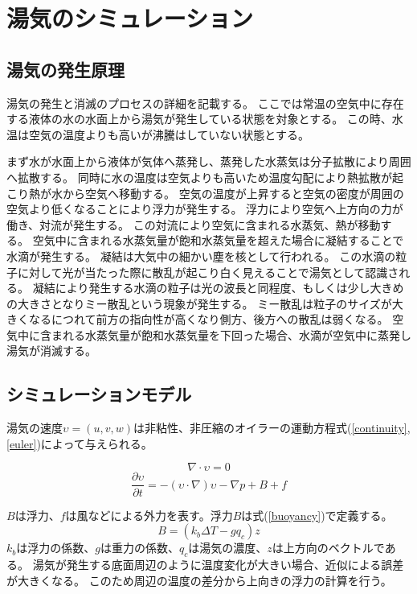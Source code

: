 \section{湯気のシミュレーション}

\subsection{湯気の発生原理}

湯気の発生と消滅のプロセスの詳細を記載する。
ここでは常温の空気中に存在する液体の水の水面上から湯気が発生している状態を対象とする。
この時、水温は空気の温度よりも高いが沸騰はしていない状態とする。

まず水が水面上から液体が気体へ蒸発し、蒸発した水蒸気は分子拡散により周囲へ拡散する。
同時に水の温度は空気よりも高いため温度勾配により熱拡散が起こり熱が水から空気へ移動する。
空気の温度が上昇すると空気の密度が周囲の空気より低くなることにより浮力が発生する。
浮力により空気へ上方向の力が働き、対流が発生する。
この対流により空気に含まれる水蒸気、熱が移動する。
空気中に含まれる水蒸気量が飽和水蒸気量を超えた場合に凝結することで水滴が発生する。
凝結は大気中の細かい塵を核として行われる。
この水滴の粒子に対して光が当たった際に散乱が起こり白く見えることで湯気として認識される。
凝結により発生する水滴の粒子は光の波長と同程度、もしくは少し大きめの大きさとなりミー散乱という現象が発生する。
ミー散乱は粒子のサイズが大きくなるにつれて前方の指向性が高くなり側方、後方への散乱は弱くなる。
空気中に含まれる水蒸気量が飽和水蒸気量を下回った場合、水滴が空気中に蒸発し湯気が消滅する。

\subsection{シミュレーションモデル}

湯気の速度$\upsilon=(u,v,w)$は非粘性、非圧縮のオイラーの運動方程式(\ref{continuity},\ref{euler})によって与えられる。


\begin{equation}
\label{continuity}
\nabla \cdot \upsilon = 0
\end{equation}
\begin{equation}
\label{euler}
\frac{\partial \upsilon}{\partial t} = -(\upsilon \cdot \nabla)\upsilon - \nabla p + B + f
\end{equation}

$B$は浮力、$f$は風などによる外力を表す。浮力$B$は式(\ref{buoyancy})で定義する。
\begin{equation}
\label{buoyancy}
B=(k_{b}\Delta{T}-gq_{c})z
\end{equation}
$k_{b}$は浮力の係数、$g$は重力の係数、$q_{c}$は湯気の濃度、$z$は上方向のベクトルである。
湯気が発生する底面周辺のように温度変化が大きい場合、近似による誤差が大きくなる。
このため周辺の温度の差分から上向きの浮力の計算を行う。

